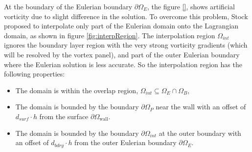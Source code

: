 At the boundary of the Eulerian boundary $\partial \Omega_E$, the figure \ref{}, shows artificial vorticity due to slight difference in the solution. To overcome this problem, Stock proposed to interpolate only part of the Eulerian domain onto the Lagrangian domain, as shown in figure \ref{fig:interpRegion}. The interpolation region $\Omega_{int}$ ignores the boundary layer region with the very strong vorticity gradients (which will be resolved by the vortex panel), and part of the outer Eulerian boundary where the Eulerian solution is less accurate. So the interpolation region has the following properties:

	\begin{itemize}
	\item The domain is within the overlap region, $\Omega_{int} \subseteq \Omega_E \cap \Omega_B$,
	\item The domain is bounded by the boundary $\partial \Omega_P$ near the wall with an offset of $d_{surf}\cdot h$ from the surface $\partial \Omega_{\mathrm{wall}}$.
	\item The domain is bounded by the boundary $\partial \Omega_{int}$ at the outer boundary with an offset of $d_{bdry}\cdot h$ from the outer Eulerian boundary $\partial \Omega_{E}$.
	\end{itemize}

